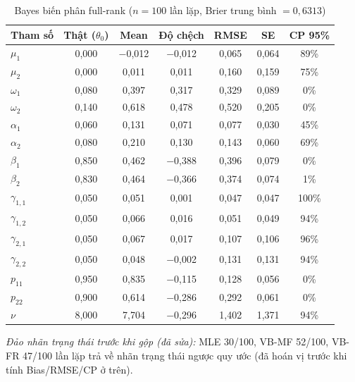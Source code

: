 \documentclass[11pt,a4paper]{article}
\begin{document}
\begin{table}[H]\centering\scriptsize
\caption{Bayes biến phân full-rank ($n=100$ lần lặp, Brier trung bình $=0,6313$)}
\begin{tabularx}{\textwidth}{l C C C C C C}
\toprule
\textbf{Tham số} & \textbf{Thật ($\theta_0$)} & \textbf{Mean} & \textbf{Độ chệch} & \textbf{RMSE} & \textbf{SE} & \textbf{CP 95\%} \\
\midrule
$\mu_1$ & 0,000 & $-$0,012 & $-$0,012 & 0,065 & 0,064 & 89\% \\
$\mu_2$ & 0,000 & 0,011 & 0,011 & 0,160 & 0,159 & 75\% \\
$\omega_1$ & 0,080 & 0,397 & 0,317 & 0,329 & 0,089 & 0\% \\
$\omega_2$ & 0,140 & 0,618 & 0,478 & 0,520 & 0,205 & 0\% \\
$\alpha_1$ & 0,060 & 0,131 & 0,071 & 0,077 & 0,030 & 45\% \\
$\alpha_2$ & 0,080 & 0,210 & 0,130 & 0,143 & 0,060 & 69\% \\
$\beta_1$ & 0,850 & 0,462 & $-$0,388 & 0,396 & 0,079 & 0\% \\
$\beta_2$ & 0,830 & 0,464 & $-$0,366 & 0,374 & 0,074 & 1\% \\
$\gamma_{1,1}$ & 0,050 & 0,051 & 0,001 & 0,047 & 0,047 & 100\% \\
$\gamma_{1,2}$ & 0,050 & 0,066 & 0,016 & 0,051 & 0,049 & 94\% \\
$\gamma_{2,1}$ & 0,050 & 0,067 & 0,017 & 0,107 & 0,106 & 96\% \\
$\gamma_{2,2}$ & 0,050 & 0,048 & $-$0,002 & 0,131 & 0,131 & 94\% \\
$p_{11}$ & 0,950 & 0,835 & $-$0,115 & 0,128 & 0,056 & 0\% \\
$p_{22}$ & 0,900 & 0,614 & $-$0,286 & 0,292 & 0,061 & 0\% \\
$\nu$ & 8,000 & 7,704 & $-$0,296 & 1,402 & 1,371 & 94\% \\
\bottomrule
\end{tabularx}
\end{table}

\emph{Đảo nhãn trạng thái trước khi gộp (đã sửa):} MLE 30/100, VB-MF 52/100, VB-FR 47/100 lần lặp trả về nhãn trạng thái ngược quy ước (đã hoán vị trước khi tính Bias/RMSE/CP ở trên).
\bigskip
\end{document}
